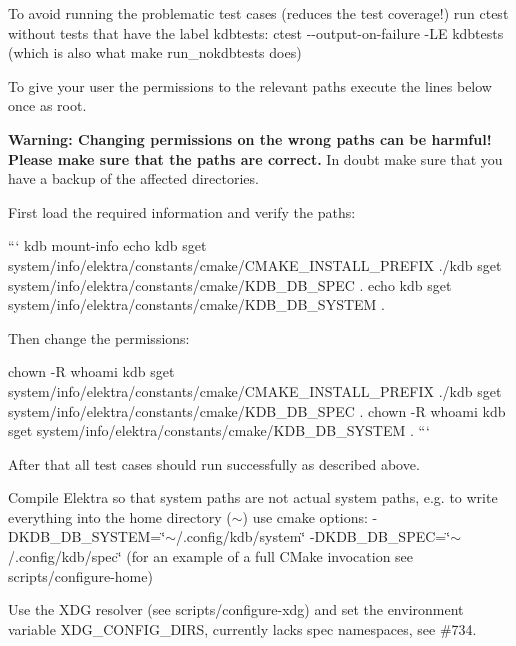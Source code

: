 \begin{DoxyEnumerate}
\item To avoid running the problematic test cases (reduces the test coverage!) run {\ttfamily ctest} without tests that have the label {\ttfamily kdbtests}\+: {\ttfamily ctest -\/-\/output-\/on-\/failure -\/\+LE kdbtests} (which is also what {\ttfamily make run\+\_\+nokdbtests} does)
\item To give your user the permissions to the relevant paths execute the lines below once as root.

{\bfseries Warning\+: Changing permissions on the wrong paths can be harmful! Please make sure that the paths are correct.} In doubt make sure that you have a backup of the affected directories.

First load the required information and verify the paths\+:

``` kdb mount-\/info echo {\ttfamily kdb sget system/info/elektra/constants/cmake/\+C\+M\+A\+K\+E\+\_\+\+I\+N\+S\+T\+A\+L\+L\+\_\+\+P\+R\+E\+F\+IX .}/{\ttfamily kdb sget system/info/elektra/constants/cmake/\+K\+D\+B\+\_\+\+D\+B\+\_\+\+S\+P\+EC .} echo {\ttfamily kdb sget system/info/elektra/constants/cmake/\+K\+D\+B\+\_\+\+D\+B\+\_\+\+S\+Y\+S\+T\+EM .} 
\begin{DoxyCode}
Then change the permissions:
\end{DoxyCode}
 chown -\/R {\ttfamily whoami} {\ttfamily kdb sget system/info/elektra/constants/cmake/\+C\+M\+A\+K\+E\+\_\+\+I\+N\+S\+T\+A\+L\+L\+\_\+\+P\+R\+E\+F\+IX .}/{\ttfamily kdb sget system/info/elektra/constants/cmake/\+K\+D\+B\+\_\+\+D\+B\+\_\+\+S\+P\+EC .} chown -\/R {\ttfamily whoami} {\ttfamily kdb sget system/info/elektra/constants/cmake/\+K\+D\+B\+\_\+\+D\+B\+\_\+\+S\+Y\+S\+T\+EM .} ```

After that all test cases should run successfully as described above.
\item Compile Elektra so that system paths are not actual system paths, e.\+g. to write everything into the home directory ({\ttfamily $\sim$}) use cmake options\+: {\ttfamily -\/\+D\+K\+D\+B\+\_\+\+D\+B\+\_\+\+S\+Y\+S\+T\+EM=\char`\"{}$\sim$/.\+config/kdb/system\char`\"{} -\/\+D\+K\+D\+B\+\_\+\+D\+B\+\_\+\+S\+P\+EC=\char`\"{}$\sim$/.\+config/kdb/spec\char`\"{}} (for an example of a full C\+Make invocation see {\ttfamily scripts/configure-\/home})
\item Use the X\+DG resolver (see {\ttfamily scripts/configure-\/xdg}) and set the environment variable {\ttfamily X\+D\+G\+\_\+\+C\+O\+N\+F\+I\+G\+\_\+\+D\+I\+RS}, currently lacks {\ttfamily spec} namespaces, see \#734.
\end{DoxyEnumerate}

